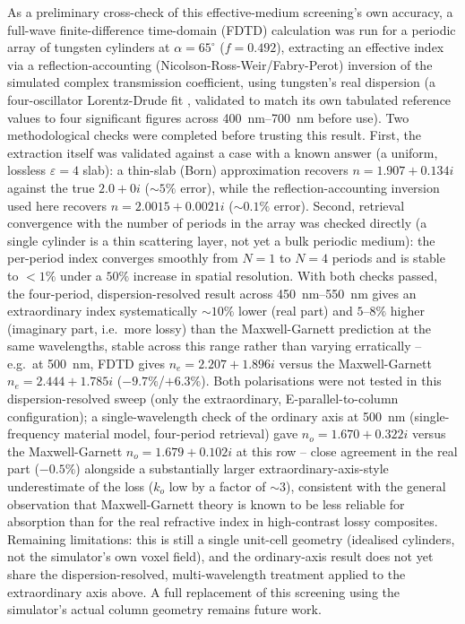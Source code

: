 \documentclass[aip,amsmath,amssymb,reprint]{revtex4-1}
\newcommand{\dang}{\ensuremath{\alpha}}
\begin{document}
As a preliminary cross-check of this effective-medium screening's own
accuracy, a full-wave finite-difference time-domain (FDTD) calculation
\citep{oskooi2010meep} was run for a periodic array of tungsten cylinders
at $\dang=65^{\circ}$ ($f=0.492$), extracting an effective index via a
reflection-accounting (Nicolson-Ross-Weir/Fabry-Perot) inversion of the
simulated complex transmission coefficient, using tungsten's real
dispersion (a four-oscillator Lorentz-Drude fit \citep{rakic1998optical},
validated to match its own tabulated reference values to four significant
figures across \SIrange{400}{700}{nm} before use). Two methodological
checks were completed before trusting this result. First, the extraction
itself was validated against a case with a known answer (a uniform,
lossless $\varepsilon=4$ slab): a thin-slab (Born) approximation recovers
$n=1.907+0.134i$ against the true $2.0+0i$ ($\sim\!5\%$ error), while the
reflection-accounting inversion used here recovers $n=2.0015+0.0021i$
($\sim\!0.1\%$ error). Second, retrieval convergence with the number of
periods in the array was checked directly (a single cylinder is a thin
scattering layer, not yet a bulk periodic medium): the per-period index
converges smoothly from $N=1$ to $N=4$ periods and is stable to
$<\!1\%$ under a $50\%$ increase in spatial resolution. With both checks
passed, the four-period, dispersion-resolved result across
\SIrange{450}{550}{nm} gives an extraordinary index systematically
$\sim\!10\%$ lower (real part) and $5$--$8\%$ higher (imaginary part,
i.e.\ more lossy) than the Maxwell-Garnett prediction at the same
wavelengths, stable across this range rather than varying erratically --
e.g.\ at \SI{500}{nm}, FDTD gives $n_e=2.207+1.896i$ versus the
Maxwell-Garnett $n_e=2.444+1.785i$ ($-9.7\%$/$+6.3\%$). Both polarisations
were not tested in this dispersion-resolved sweep (only the extraordinary,
E-parallel-to-column configuration); a single-wavelength check of the
ordinary axis at \SI{500}{nm} (single-frequency material model, four-period
retrieval) gave $n_o=1.670+0.322i$ versus the Maxwell-Garnett
$n_o=1.679+0.102i$ at this row -- close agreement in the real part
($-0.5\%$) alongside a substantially larger extraordinary-axis-style
underestimate of the loss ($k_o$ low by a factor of $\sim\!3$), consistent
with the general observation that Maxwell-Garnett theory is known to be
less reliable for absorption than for the real refractive index in
high-contrast lossy composites. Remaining limitations: this is still a
single unit-cell geometry (idealised cylinders, not the simulator's own
voxel field), and the ordinary-axis result does not yet share the
dispersion-resolved, multi-wavelength treatment applied to the
extraordinary axis above. A full replacement of this screening using the
simulator's actual column geometry remains future work.
\end{document}
